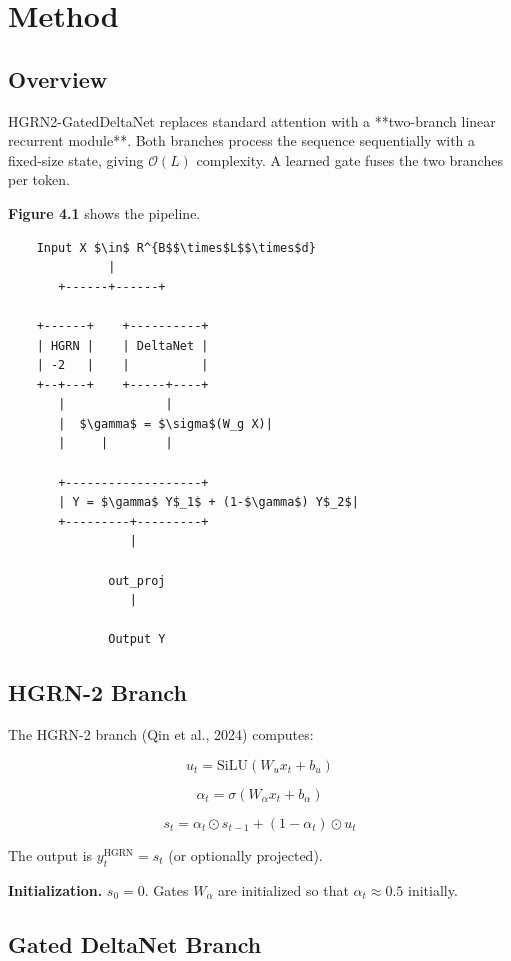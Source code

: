 \section{Method}

\subsection{Overview}

HGRN2-GatedDeltaNet replaces standard attention with a **two-branch linear 
recurrent module**. Both branches process the sequence sequentially with a 
fixed-size state, giving $\mathcal{O}(L)$ complexity. A learned gate fuses 
the two branches per token.

\textbf{Figure 4.1} shows the pipeline.

\begin{lstlisting}
    Input X $\in$ R^{B$$\times$L$$\times$d}
              |
       +------+------+
                      
    +------+    +----------+
    | HGRN |    | DeltaNet |
    | -2   |    |          |
    +--+---+    +-----+----+
       |              |
       |  $\gamma$ = $\sigma$(W_g X)|
       |     |        |
                       
       +-------------------+
       | Y = $\gamma$ Y$_1$ + (1-$\gamma$) Y$_2$|
       +---------+---------+
                 |
                  
              out_proj
                 |
                  
              Output Y
\end{lstlisting}

\subsection{HGRN-2 Branch}

The HGRN-2 branch (Qin et al., 2024) computes:

\[
u_t = \text{SiLU}(W_u x_t + b_u)
\tag{4.1}
\]

\[
\alpha_t = \sigma(W_\alpha x_t + b_\alpha)
\tag{4.2}
\]

\[
s_t = \alpha_t \odot s_{t-1} + (1 - \alpha_t) \odot u_t
\tag{4.3}
\]

The output is $y_t^\text{HGRN} = s_t$ (or optionally projected).

\textbf{Initialization.} $s_0 = 0$. Gates $W_\alpha$ are initialized so that 
$\alpha_t \approx 0.5$ initially.

\subsection{Gated DeltaNet Branch}


